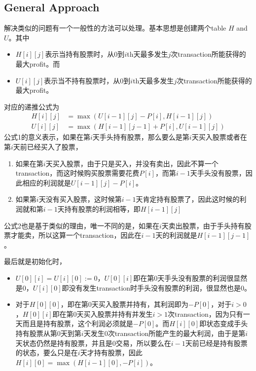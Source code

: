 \subsection{General Approach}
解决类似的问题有一个一般性的方法可以处理。基本思想是创建两个table $H$ and $U$。其中
\begin{itemize}
\item $H[i][j]$表示当持有股票时，从0到$i$th天最多发生$j$次transaction所能获得的最大profit。而
\item $U[i][j]$表示当不持有股票时，从0到$i$th天最多发生$j$次transaction所能获得的最大profit。
\end{itemize}
对应的递推公式为
\begin{align*}
H[i][j] &= \max(U[i-1][j]-P[i], H[i-1][j]) \\
U[i][j] &= \max(H[i-1][j-1] + P[i], U[i-1][j])
\end{align*}
公式1的意义表示，如果在第$i$天手头持有股票，那么要么是第$i$天买入股票或者在第$i$天前已经买入了股票，
\begin{enumerate}
\item 如果在第$i$天买入股票，由于只是买入，并没有卖出，因此不算一个transaction，而这时候购买股票需要花费$P[i]$，而第$i-1$天手头没有股票，因此相应的利润就是$U[i-1][j] - P[i]$。
\item 如果第$i$天没有买入股票，这时候第$i-1$天肯定持有股票了，因此这时候的利润就和第$i-1$天持有股票的利润相等，即$H[i-1][j]$
\end{enumerate}
公式2也是基于类似的理由，唯一不同的是，如果在$i$天卖出股票，由于手头持有股票才能卖，所以这算一个transaction，因此在$i-1$天的利润就是$H[i-1][j-1]$。

最后就是初始化时，
\begin{itemize}
\item $U[0][i]=U[i][0]:=0$，$U[0][i]$即在第0天手头没有股票的利润很显然是0，$U[i][0]$即没有发生transaction时手头没有股票的利润，很显然也是0。
\item 对于$H[0][0]$，即在第0天买入股票并持有，其利润即为$-P[0]$，对于$i>0$，$H[0][i]$即在第0天买入股票并持有并发生$i>1$次transaction，因为只有一天而且是持有股票，这个利润必须就是$-P[0]$。而$H[i][0]$即状态变成手头持有股票从第0天到第$i$天发生0次transaction所能产生的最大利润，由于是第$i$天状态仍然是持有股票，并且是0交易，所以要么在$i-1$天前已经是持有股票的状态，要么只是在$i$天才持有股票，因此$H[i][0]=\max(H[i-1][0], -P[i])$。
\end{itemize}

